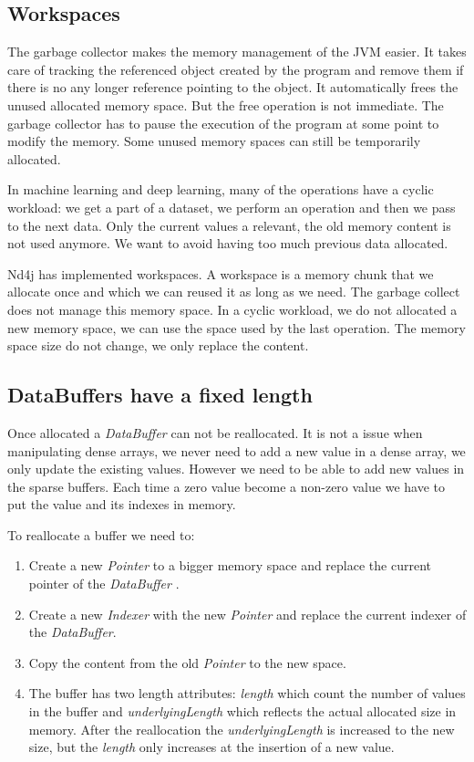 \subsection{Workspaces}

The garbage collector makes the memory management of the JVM easier. It takes care of tracking the referenced object created by the program and remove them if there is no any longer reference pointing to the object. It automatically frees the unused allocated memory space. But the free operation is not immediate. The garbage collector has to pause the execution of the program at some point to modify the memory. Some unused memory spaces can still be temporarily allocated.

In machine learning and deep learning, many of the operations have a cyclic workload: we get a part of a dataset, we perform an operation and then we pass to the next data. Only the current values a relevant, the old memory content is not  used anymore. We want to avoid having too much previous data allocated.

Nd4j has implemented workspaces. A workspace is a memory chunk that we allocate once and which we can reused it as long as we need. The garbage collect does not manage this memory space. In a cyclic workload, we do not allocated a new memory space, we can use the space used by the last operation. The memory space size do not change, we only replace the content.



\subsection{DataBuffers have a fixed length}

Once allocated a \textit{DataBuffer} can not be reallocated. It is not a issue when manipulating dense arrays, we never need to add a new value in a dense array, we only update the existing values. However we need to be able to add new values in the sparse buffers. Each time a zero value become a non-zero value we have to put the value and its indexes in memory.

To reallocate a buffer we need to:
\begin{enumerate}
	\item Create a new \textit{Pointer} to a bigger memory space and replace the current pointer of the \textit{DataBuffer} .
	\item Create a new \textit{Indexer} with the new \textit{Pointer} and replace the current indexer of the \textit{DataBuffer}.
	\item Copy the content from the old \textit{Pointer} to the new space.
	\item The buffer has two length attributes: \textit{length} which count the number of values in the buffer and \textit{underlyingLength} which reflects the actual allocated size in memory. After the reallocation the \textit{underlyingLength} is increased to the new size, but the \textit{length} only increases at the insertion of a new value.
\end{enumerate}

